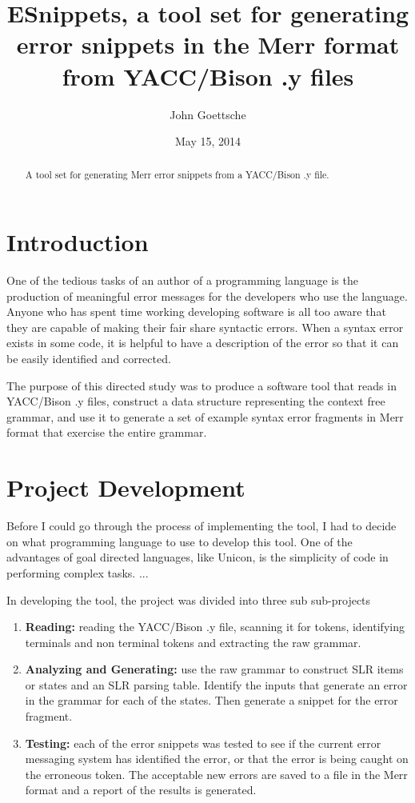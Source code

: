 \documentclass{article}
\begin{document}
\title{ESnippets, a tool set for generating error snippets in the Merr format from YACC/Bison .y files}
\author{John Goettsche}
\date{May 15, 2014}

\maketitle
\begin{abstract}
A tool set for generating Merr error snippets from a YACC/Bison .y file.
\end{abstract}

\section{Introduction}
One of the tedious tasks of an author of a programming language is the production of meaningful error messages for the developers who use the language.  Anyone who has spent time working developing software is all too aware that they are capable of making their fair share syntactic errors.  When a syntax error exists in some code, it is helpful to have a description of the error so that it can be easily identified and corrected.

The purpose of this directed study was to produce a software tool that reads in YACC/Bison .y files, construct a data structure representing the context free grammar, and use it to generate a set of example syntax error fragments in Merr format that exercise the entire grammar.

\section{Project Development}
Before I could go through the process of implementing the tool, I had to decide on what programming language to use to develop this tool.  One of the advantages of goal directed languages, like Unicon, is the simplicity of code in performing complex tasks. ...

In developing the tool, the project was divided into three sub sub-projects
\begin{enumerate}
\item \textbf{Reading:} reading the YACC/Bison .y file, scanning it for tokens, identifying terminals and non terminal tokens and extracting the raw grammar.
\item \textbf{Analyzing and Generating:} use the raw grammar to construct SLR items or states and an SLR parsing table.  Identify the inputs that generate an error in the grammar for each of the states.  Then generate a snippet for the error fragment.
\item \textbf{Testing:} each of the error snippets was tested to see if the current error messaging system has identified the error, or that the error is being caught on the erroneous token.  The acceptable new errors are saved to a file in the Merr format and a report of the results is generated.
\end{enumerate}
\end{document}
